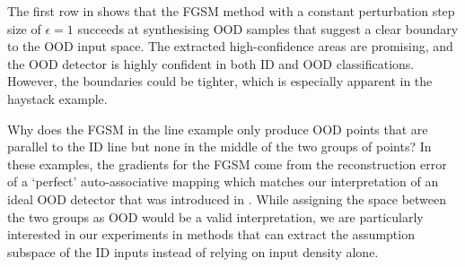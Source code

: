 The first row in  shows that the FGSM method with a constant perturbation step size of $\epsilon = 1$ succeeds at synthesising OOD samples that suggest a clear boundary to the OOD input space. The extracted high-confidence areas are promising, and the OOD detector is highly confident in both ID and OOD classifications. However, the boundaries could be tighter, which is especially apparent in the haystack example.

\newpar Why does the FGSM in the line example only produce OOD points that are parallel to the ID line but none in the middle of the two groups of points? In these examples, the gradients for the FGSM come from the reconstruction error of a `perfect' auto-associative mapping which matches our interpretation of an ideal OOD detector that was introduced in . While assigning the space between the two groups as OOD would be a valid interpretation, we are particularly interested in our experiments in methods that can extract the assumption subspace of the ID inputs instead of relying on input density alone.

